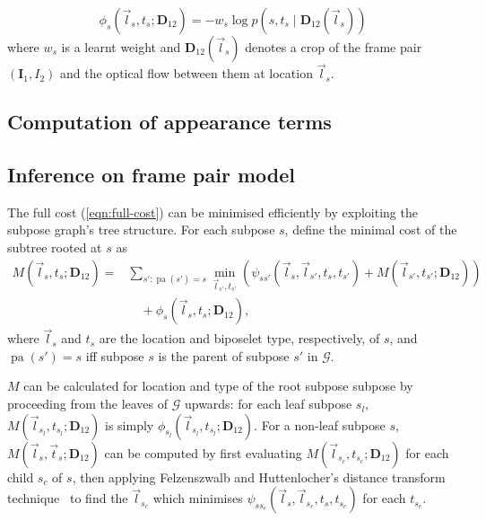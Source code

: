 \documentclass[runningheads]{llncs}
\newcommand{\mat}{\mathbf}
\DeclareMathOperator{\pa}{pa}
\begin{document}
\begin{equation}\label{eqn:unary-cost}
\phi_s(\vec l_s, t_s; \mat D_{12}) = -w_s \log p(s, t_s \mid \mat D_{12}(\vec l_s))
\end{equation}
%
where $w_s$ is a learnt weight and $\mat D_{12}(\vec l_s)$ denotes a crop of the
frame pair $(\mat I_1, I_2)$ and the optical flow between them at location $\vec
l_s$.

\subsection{Computation of appearance terms}
\label{sec:unaries}



\subsection{Inference on frame pair model}

The full cost (\ref{eqn:full-cost}) can be minimised efficiently by exploiting
the subpose graph's tree structure. For each subpose $s$, define the minimal
cost of the subtree rooted at $s$ as
%
\begin{equation}\label{eqn:reccost}
\begin{split}
M(\vec l_s, t_s; \mat D_{12}) =
&\sum_{s' : \pa(s') = s} \min_{\vec l_{s'}, t_{s'}} \left(\psi_{s s'}(\vec l_s,
\vec l_{s'}, t_s, t_{s'}) + M(\vec l_{s'}, t_{s'}; \mat D_{12})\right)
\\&\quad+ \phi_s(\vec l_s, t_s; \mat D_{12}),
\end{split}
\end{equation}
%
where $\vec l_s$ and $t_s$ are the location and biposelet type, respectively, of
$s$, and $\pa(s') = s$ iff subpose $s$ is the parent of subpose $s'$ in
$\mathcal G$.

$M$ can be calculated for location and type of the root subpose subpose by
proceeding from the leaves of $\mathcal G$ upwards: for each leaf subpose $s_l$,
$M(\vec l_{s_l}, t_{s_l}; \mat D_{12})$ is simply $\phi_{s_l}(\vec l_{s_l},
t_{s_l}; \mat D_{12})$. For a non-leaf subpose $s$, $M(\vec l_s, \vec t_s; \mat
D_{12})$ can be computed by first evaluating $M(\vec l_{s_c}, t_{s_c}; \mat
D_{12})$ for each child $s_c$ of $s$, then applying Felzenszwalb and
Huttenlocher's distance transform technique~\cite{felzenszwalb2012distance} to
find the $\vec l_{s_c}$ which minimises $\psi_{s s_c}(\vec l_s, \vec l_{s_c},
t_s, t_{s_c})$ for each $t_{s_c}$.
\end{document}

